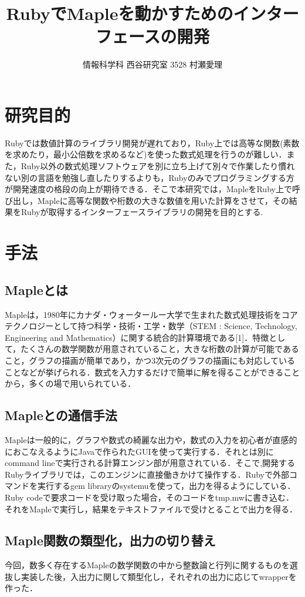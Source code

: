\documentclass[10pt,a4j,twocolumn]{jsarticle}
\begin{document}
\title{RubyでMapleを動かすためのインターフェースの開発}
\author{情報科学科 西谷研究室 3528 村瀬愛理}
\date{}
\maketitle
\section{研究目的}
Rubyでは数値計算のライブラリ開発が遅れており，Ruby上では高等な関数(素数を求めたり，最小公倍数を求めるなど)を使った数式処理を行うのが難しい．また，Ruby以外の数式処理ソフトウェアを別に立ち上げて別々で作業したり慣れない別の言語を勉強し直したりするよりも，Rubyのみでプログラミングする方が開発速度の格段の向上が期待できる．そこで本研究では，MapleをRuby上で呼び出し，Mapleに高等な関数や桁数の大きな数値を用いた計算をさせて，その結果をRubyが取得するインターフェースライブラリの開発を目的とする.

\section{手法}
\subsection{Mapleとは}
Mapleは，1980年にカナダ・ウォータールー大学で生まれた数式処理技術をコアテクノロジーとして持つ科学・技術・工学・数学（STEM : Science, Technology, Engineering and Mathematics）に関する統合的計算環境である[1]．特徴として，たくさんの数学関数が用意されていること，大きな桁数の計算が可能であること，グラフの描画が簡単であり，かつ3次元のグラフの描画にも対応していることなどが挙げられる．数式を入力するだけで簡単に解を得ることができることから，多くの場で用いられている．

\subsection{Mapleとの通信手法}
Mapleは一般的に，グラフや数式の綺麗な出力や，数式の入力を初心者が直感的におこなえるようにJavaで作られたGUIを使って実行する．それとは別にcommand lineで実行される計算エンジン部が用意されている．そこで,開発するRubyライブラリでは，このエンジンに直接働きかけて操作する．Rubyで外部コマンドを実行するgem libraryのsystemuを使って，出力を得るようにしている．Ruby codeで要求コードを受け取った場合，そのコードをtmp.mwに書き込む．それをMapleで実行し，結果をテキストファイルで受けとることで出力を得る．

\subsection{Maple関数の類型化，出力の切り替え}
今回，数多く存在するMapleの数学関数の中から整数論と行列に関するものを選抜し実装した後，入出力に関して類型化し，それぞれの出力に応じてwrapperを作った．
\end{document}
